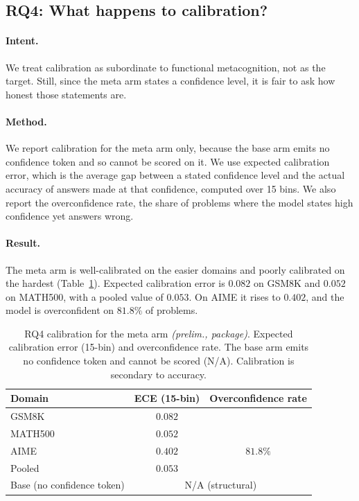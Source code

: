 \subsection{RQ4: What happens to calibration?}
\label{sec:exp:rq4}

\paragraph{Intent.} We treat calibration as subordinate to functional
metacognition, not as the target. Still, since the meta arm states a confidence
level, it is fair to ask how honest those statements are.

\paragraph{Method.} We report calibration for the meta arm only, because the base
arm emits no confidence token and so cannot be scored on it. We use expected
calibration error, which is the average gap between a stated confidence level and
the actual accuracy of answers made at that confidence, computed over 15 bins. We
also report the overconfidence rate, the share of problems where the model states
high confidence yet answers wrong.

\paragraph{Result.} The meta arm is well-calibrated on the easier domains and
poorly calibrated on the hardest (Table~\ref{tab:t4}). Expected calibration error
is $0.082$ on GSM8K and $0.052$ on MATH500, with a pooled value of $0.053$. On
AIME it rises to $0.402$, and the model is overconfident on $81.8\%$ of problems.

\begin{table}[t]
\caption{RQ4 calibration for the meta arm \emph{(prelim., package)}. Expected
calibration error (15-bin) and overconfidence rate. The base arm emits no
confidence token and cannot be scored (N/A). Calibration is secondary to
accuracy.}
\label{tab:t4}
\begin{center}
\small
\begin{tabular}{lcc}
\toprule
Domain & ECE (15-bin) & Overconfidence rate \\
\midrule
GSM8K   & $0.082$ & \todo{} \\
MATH500 & $0.052$ & \todo{} \\
AIME    & $0.402$ & $81.8\%$ \\
Pooled  & $\mathbf{0.053}$ & \todo{} \\
\midrule
Base (no confidence token) & \multicolumn{2}{c}{N/A (structural)} \\
\bottomrule
\end{tabular}
\end{center}
\end{table}

